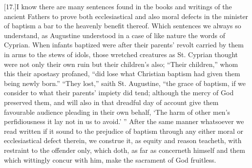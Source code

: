 [17.]I know there are many sentences found in the books and writings of the ancient Fathers to prove both ecclesiastical and also moral defects in the minister of baptism a bar to the heavenly benefit thereof. Which sentences we always so understand, as Augustine understood in a case of like nature the words of Cyprian. When infants baptized were after their parents’ revolt carried by them in arms to the stews of idols, those wretched creatures as St. Cyprian thought were not only their own ruin but their children’s also; “Their children,” whom this their apostasy profaned, “did lose what Christian baptism had given them being newly born.” “They lost,” saith St. Augustine, “the grace of baptism, if we consider to what their parents’ impiety did tend; although the mercy of God preserved them, and will also in that dreadful day of account give them favourable audience pleading in their own behalf, ‘The harm of other men’s perfidiousness it lay not in us to avoid.’ ” After the same manner whatsoever we  read written if it sound to the prejudice of baptism through any either moral or ecclesiastical defect therein,
 we construe it, as equity and reason teacheth, with restraint to the offender only, which doth, as far as concerneth himself and them which wittingly concur with him, make the sacrament of God fruitless.

